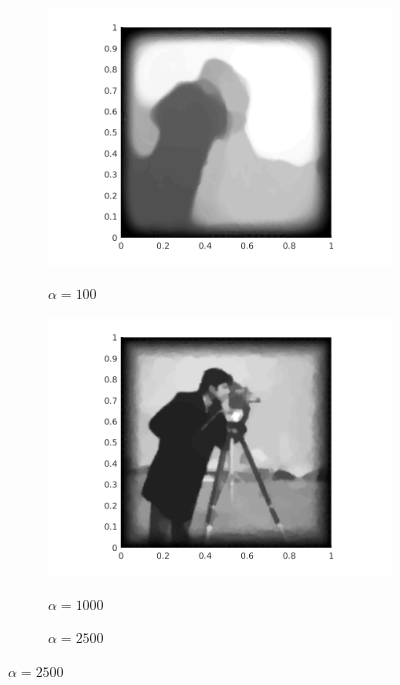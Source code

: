 \begin{figure}[h]
  \begin{subfigure}{.3\linewidth}
    \caption{$\alpha=100$}
    \includegraphics[trim = 60 0 60 20, clip, width=\linewidth]
      {pictures/introBeta/snr10/00100.png}
    \label{fig:snr10alpha100}
  \end{subfigure}
  \begin{subfigure}{.3\linewidth}
    \caption{$\alpha=1000$}
    \includegraphics[trim = 60 0 60 20, clip, width=\linewidth]
      {pictures/introBeta/snr10/01000.png}
    \label{fig:snr10alpha1000}
  \end{subfigure}
  \begin{subfigure}{.3\linewidth}
    \caption{$\alpha=2500$}

\end{subfigure}
\end{figure}
